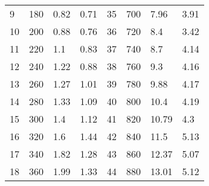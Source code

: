 \begin{table}[H]
\begin{adjustbox}{angle=270}
{\begin{tabular}{|l|l|l|l|l|l|l|l|}
9                                     & 180      & 0.82                       & 0.71                         & 35                                    & 700      & 7.96                       & 3.91                          \\
10                                    & 200      & 0.88                       & 0.76                         & 36                                    & 720      & 8.4                        & 3.42                          \\
11                                    & 220      & 1.1                        & 0.83                         & 37                                    & 740      & 8.7                        & 4.14                          \\
12                                    & 240      & 1.22                       & 0.88                         & 38                                    & 760      & 9.3                        & 4.16                          \\
13                                    & 260      & 1.27                       & 1.01                         & 39                                    & 780      & 9.88                       & 4.17                          \\
14                                    & 280      & 1.33                       & 1.09                         & 40                                    & 800      & 10.4                       & 4.19                          \\
15                                    & 300      & 1.4                        & 1.12                         & 41                                    & 820      & 10.79                      & 4.3                           \\
16                                    & 320      & 1.6                        & 1.44                         & 42                                    & 840      & 11.5                       & 5.13                          \\
17                                    & 340      & 1.82                       & 1.28                         & 43                                    & 860      & 12.37                      & 5.07                          \\
18                                    & 360      & 1.99                       & 1.33                         & 44                                    & 880      & 13.01                      & 5.12                          \\

\end{tabular}}
\end{adjustbox}
\end{table}
